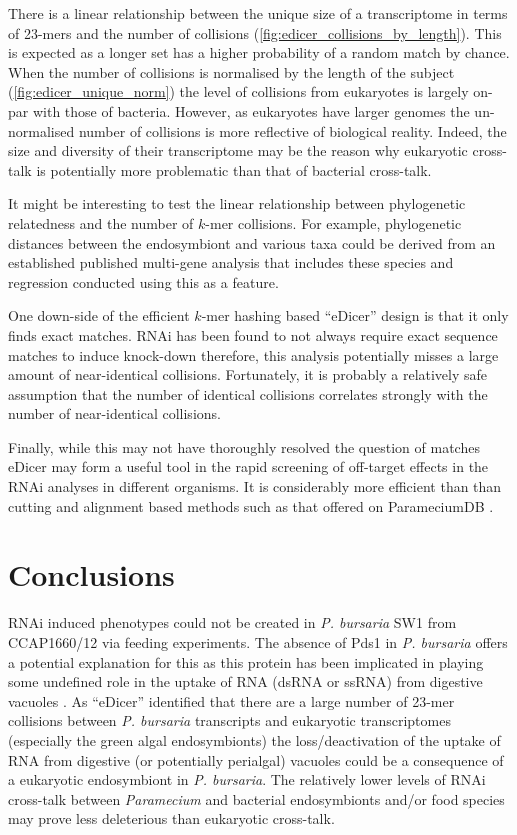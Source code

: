 There is a linear relationship between the unique size of a transcriptome
in terms of 23-mers and the number of collisions (\cref{fig:edicer_collisions_by_length}).  
This is expected
as a longer set has a higher probability of a random match by chance.
When the number of collisions is normalised by the length of the subject (\cref{fig:edicer_unique_norm})
the level of collisions from eukaryotes is largely on-par with
those of bacteria.  However, as eukaryotes have larger genomes
the un-normalised number of collisions is more reflective of biological
reality.  Indeed, the size and diversity of their transcriptome
may be the reason why eukaryotic cross-talk is potentially
more problematic than that of bacterial cross-talk.


It might be interesting to test the linear relationship between phylogenetic
relatedness and the number of \(k\)-mer collisions.  For example, phylogenetic distances
between the endosymbiont and various taxa could be derived from an established
published multi-gene analysis that includes these species and regression
conducted using this as a feature. 

One down-side of the efficient \(k\)-mer hashing based ``eDicer'' design is that
it only finds exact matches.  RNAi has been found to not always require exact
sequence matches to induce knock-down \citep{Elbashir2001} therefore,
this analysis potentially misses a large amount of near-identical collisions.
Fortunately, it is probably a relatively safe assumption that the number
of identical collisions correlates strongly with the number of near-identical collisions.

Finally, while this may not have thoroughly resolved the question of matches
eDicer may form a useful tool in the rapid screening of off-target effects
in the RNAi analyses in different organisms.   It is considerably
more efficient than than cutting and alignment based methods such as that
offered on ParameciumDB \citep{Arnaiz2011}.

\section{Conclusions}

RNAi induced phenotypes could not be created in \textit{P. bursaria} SW1 from CCAP1660/12
via feeding experiments.  The absence of Pds1 in \textit{P. bursaria} offers a potential 
explanation for this as this protein has been implicated in playing some undefined role
in the uptake of RNA (dsRNA or ssRNA) from digestive vacuoles \citep{Carradec2015}.
As ``eDicer'' identified that there are a large number of 23-mer collisions
between \textit{P. bursaria} transcripts and eukaryotic transcriptomes (especially
the green algal endosymbionts) the loss/deactivation of the uptake of RNA from 
digestive (or potentially perialgal) vacuoles could be a consequence of 
a eukaryotic endosymbiont in \textit{P. bursaria}.  
The relatively lower levels of RNAi cross-talk between
\textit{Paramecium} and bacterial endosymbionts and/or food species may prove
less deleterious than eukaryotic cross-talk. 

